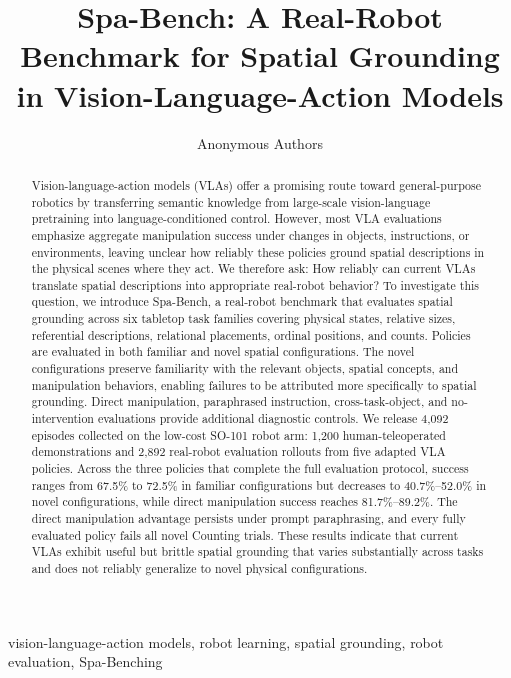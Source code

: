 \documentclass[conference]{IEEEtran}
\title{Spa-Bench: A Real-Robot Benchmark for Spatial Grounding
in Vision-Language-Action Models}
\author{Anonymous Authors}
\begin{document}
\maketitle

\begin{abstract}
Vision-language-action models (VLAs) offer a promising route toward general-purpose robotics by transferring semantic knowledge from large-scale vision-language pretraining into language-conditioned control. However, most VLA evaluations emphasize aggregate manipulation success under changes in objects, instructions, or environments, leaving unclear how reliably these policies ground spatial descriptions in the physical scenes where they act. We therefore ask: How reliably can current VLAs translate spatial descriptions into appropriate real-robot behavior? To investigate this question, we introduce Spa-Bench, a real-robot benchmark that evaluates spatial grounding across six tabletop task families covering physical states, relative sizes, referential descriptions, relational placements, ordinal positions, and counts. Policies are evaluated in both familiar and novel spatial configurations. The novel configurations preserve familiarity with the relevant objects, spatial concepts, and manipulation behaviors, enabling failures to be attributed more specifically to spatial grounding. Direct manipulation, paraphrased instruction, cross-task-object, and no-intervention evaluations provide additional diagnostic controls. We release 4,092 episodes collected on the low-cost SO-101 robot arm: 1,200 human-teleoperated demonstrations and 2,892 real-robot evaluation rollouts from five adapted VLA policies. Across the three policies that complete the full evaluation protocol, success ranges from 67.5\% to 72.5\% in familiar configurations but decreases to 40.7\%--52.0\% in novel configurations, while direct manipulation success reaches 81.7\%--89.2\%. The direct manipulation advantage persists under prompt paraphrasing, and every fully evaluated policy fails all novel Counting trials. These results indicate that current VLAs exhibit useful but brittle spatial grounding that varies substantially across tasks and does not reliably generalize to novel physical configurations.
\end{abstract}

\begin{IEEEkeywords}
vision-language-action models, robot learning, spatial grounding, robot evaluation, Spa-Benching
\end{IEEEkeywords}
\end{document}
